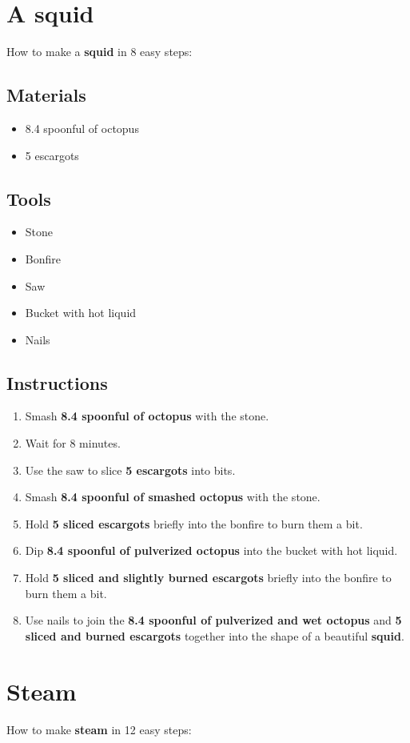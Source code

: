 \documentclass{article}
\begin{document}
\section{A squid}How to make a \textbf{squid} in 8 easy steps:

\subsection{Materials}\begin{itemize}
\item 
8.4 spoonful of octopus
\item 
5 escargots
\end{itemize}
\subsection{Tools}\begin{itemize}
\item 
Stone
\item 
Bonfire
\item 
Saw
\item 
Bucket with hot liquid
\item 
Nails
\end{itemize}
\subsection{Instructions}\begin{enumerate}
\item 
Smash \textbf{8.4 spoonful of octopus} with the stone.
\item 
Wait for 8 minutes.
\item 
Use the saw to slice \textbf{5 escargots} into bits.
\item 
Smash \textbf{8.4 spoonful of smashed octopus} with the stone.
\item 
Hold \textbf{5 sliced escargots} briefly into the bonfire to burn them a bit.
\item 
Dip \textbf{8.4 spoonful of pulverized octopus} into the bucket with hot liquid.
\item 
Hold \textbf{5 sliced and slightly burned escargots} briefly into the bonfire to burn them a bit.
\item 
Use nails to join the \textbf{8.4 spoonful of pulverized and wet octopus} and \textbf{5 sliced and burned escargots} together into the shape of a beautiful \textbf{squid}.
\end{enumerate}
\newpage
\section{Steam}How to make \textbf{steam} in 12 easy steps:
\end{document}
